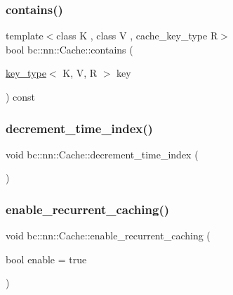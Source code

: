 \subsubsection{\texorpdfstring{contains()}{contains()}}
{\footnotesize\ttfamily template$<$class K , class V , cache\+\_\+key\+\_\+type R$>$ \\
bool bc\+::nn\+::\+Cache\+::contains (\begin{DoxyParamCaption}\item[{\hyperlink{structbc_1_1nn_1_1Cache_aedd77c5710dcb5f9edd8ecb3c3041048}{key\+\_\+type}$<$ K, V, R $>$}]{key }\end{DoxyParamCaption}) const\hspace{0.3cm}{\ttfamily [inline]}}

\mbox{\label{structbc_1_1nn_1_1Cache_ae67689af283aadf9ccc5f05a68959bbe}} 
\subsubsection{\texorpdfstring{decrement\+\_\+time\+\_\+index()}{decrement\_time\_index()}}
{\footnotesize\ttfamily void bc\+::nn\+::\+Cache\+::decrement\+\_\+time\+\_\+index (\begin{DoxyParamCaption}{ }\end{DoxyParamCaption})\hspace{0.3cm}{\ttfamily [inline]}}

\mbox{\label{structbc_1_1nn_1_1Cache_a9fcf5a41d0e0a818ab29db438db392f0}} 
\subsubsection{\texorpdfstring{enable\+\_\+recurrent\+\_\+caching()}{enable\_recurrent\_caching()}}
{\footnotesize\ttfamily void bc\+::nn\+::\+Cache\+::enable\+\_\+recurrent\+\_\+caching (\begin{DoxyParamCaption}\item[{bool}]{enable = {\ttfamily true} }\end{DoxyParamCaption})\hspace{0.3cm}{\ttfamily [inline]}}

